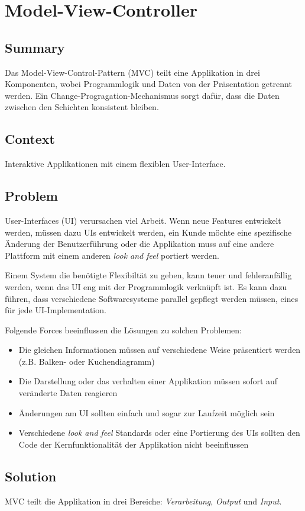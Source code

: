 \chapter{Model-View-Controller}

\section{Summary}
Das Model-View-Control-Pattern (MVC) teilt eine Applikation in drei Komponenten, wobei Programmlogik und Daten von der Präsentation getrennt werden. Ein Change-Progragation-Mechanismus sorgt dafür, dass die Daten zwischen den Schichten konsistent bleiben.
\section{Context}
Interaktive Applikationen mit einem flexiblen User-Interface.
\section{Problem}
User-Interfaces (UI) verursachen viel Arbeit. Wenn neue Features entwickelt werden, müssen dazu UIs entwickelt werden, ein Kunde möchte eine spezifische Änderung der Benutzerführung oder die Applikation muss auf eine andere Plattform mit einem anderen \textit{look and feel} portiert werden. 

Einem System die benötigte Flexibiltät zu geben, kann teuer und fehleranfällig werden, wenn das UI eng mit der Programmlogik verknüpft ist. Es kann dazu führen, dass verschiedene Softwaresysteme parallel gepflegt werden müssen, eines für jede UI-Implementation.

Folgende Forces beeinflussen die Lösungen zu solchen Problemen:
\begin{itemize}
	\item Die gleichen Informationen müssen auf verschiedene Weise präsentiert werden (z.B. Balken- oder Kuchendiagramm)
	\item Die Darstellung oder das verhalten einer Applikation müssen sofort auf veränderte Daten reagieren
	\item Änderungen am UI sollten einfach und sogar zur Laufzeit möglich sein
	\item Verschiedene \textit{look and feel} Standards oder eine Portierung des UIs sollten den Code der Kernfunktionalität der Applikation nicht beeinflussen
\end{itemize}

\section{Solution}
MVC teilt die Applikation in drei Bereiche: \textit{Verarbeitung}, \textit{Output} und \textit{Input}. 

